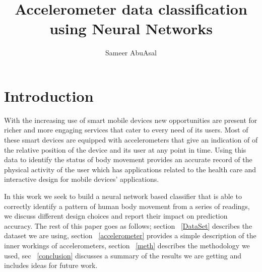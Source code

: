 \documentclass{article}
\title{Accelerometer data classification using Neural Networks}
\author{Sameer AbuAsal}
\date{}
\begin{document}
\maketitle




\pagebreak
\tableofcontents

\pagebreak
\listoffigures

\pagebreak
\listoftables

\pagebreak

%
%
\section{Introduction}
\label{introduction}

With the increasing use of smart mobile devices new opportunities are present for richer and more engaging services 
that cater to every need of its users. Most of these smart devices are equipped with accelerometers that give an
indication of of the relative position of the device and its user at any point in time. Using this data to identify the 
status of body movement provides an accurate record of the physical activity of the user which has applications related 
to the health care and interactive design for mobile devices' applications. 

In this work we seek to build a neural network based classifier that is able to correctly identify a pattern of human body 
movement from a series of readings, we discuss different design choices and report their impact on prediction accuracy. The 
rest of this paper goes as follows; section ~\ref{DataSet} describes the dataset we are using, section ~\ref{accelerometer} 
provides a simple description of the inner workings of accelerometers, section ~\ref{meth} describes the methodology we 
used, sec ~\ref{conclusion} discusses a summary of the results we are getting and includes ideas for future work.
\end{document}
